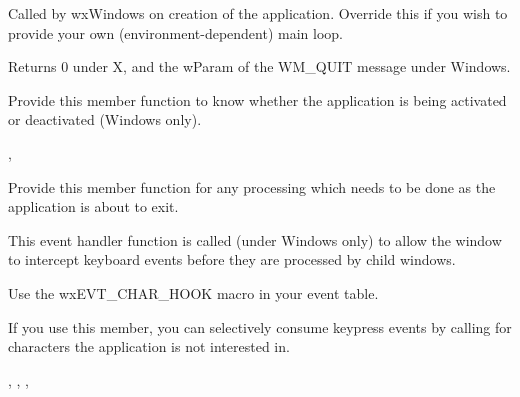 \label{wxappmainloop}


Called by wxWindows on creation of the application. Override this if you wish
to provide your own (environment-dependent) main loop.


Returns 0 under X, and the wParam of the WM\_QUIT message under Windows.

\label{wxapponactivate}


Provide this member function to know whether the application is being
activated or deactivated (Windows only).


, 

\label{wxapponexit}


Provide this member function for any processing which needs to be done as
the application is about to exit.

\label{wxapponcharhook}


This event handler function is called (under Windows only) to allow the window to intercept keyboard events
before they are processed by child windows.




Use the wxEVT\_CHAR\_HOOK macro in your event table.

If you use this member, you can selectively consume keypress events by calling\rtfsp
{} for characters the application is not interested in.


, ,\rtfsp
{}, 

\label{wxapponidle}

